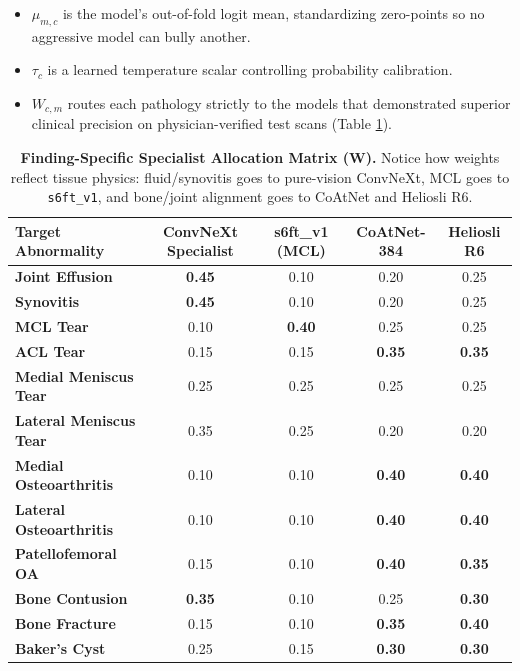 \documentclass[11pt,a4paper]{article}
\begin{document}
\begin{itemize}[leftmargin=*]
    \item $\mu_{m,c}$ is the model's out-of-fold logit mean, standardizing zero-points so no aggressive model can bully another.
    \item $\tau_c$ is a learned temperature scalar controlling probability calibration.
    \item $W_{c,m}$ routes each pathology strictly to the models that demonstrated superior clinical precision on physician-verified test scans (Table \ref{tab:routing}).
\end{itemize}

\begin{table}[h!]
\centering
\small
\renewcommand{\arraystretch}{1.25}
\begin{tabularx}{\textwidth}{l c c c c}
\toprule
\textbf{Target Abnormality} & \textbf{ConvNeXt Specialist} & \textbf{s6ft\_v1 (MCL)} & \textbf{CoAtNet-384} & \textbf{Heliosli R6} \\
\midrule
\textbf{Joint Effusion} & \textbf{0.45} & 0.10 & 0.20 & 0.25 \\
\textbf{Synovitis} & \textbf{0.45} & 0.10 & 0.20 & 0.25 \\
\textbf{MCL Tear} & 0.10 & \textbf{0.40} & 0.25 & 0.25 \\
\textbf{ACL Tear} & 0.15 & 0.15 & \textbf{0.35} & \textbf{0.35} \\
\textbf{Medial Meniscus Tear} & 0.25 & 0.25 & 0.25 & 0.25 \\
\textbf{Lateral Meniscus Tear} & 0.35 & 0.25 & 0.20 & 0.20 \\
\textbf{Medial Osteoarthritis} & 0.10 & 0.10 & \textbf{0.40} & \textbf{0.40} \\
\textbf{Lateral Osteoarthritis} & 0.10 & 0.10 & \textbf{0.40} & \textbf{0.40} \\
\textbf{Patellofemoral OA} & 0.15 & 0.10 & \textbf{0.40} & \textbf{0.35} \\
\textbf{Bone Contusion} & \textbf{0.35} & 0.10 & 0.25 & \textbf{0.30} \\
\textbf{Bone Fracture} & 0.15 & 0.10 & \textbf{0.35} & \textbf{0.40} \\
\textbf{Baker's Cyst} & 0.25 & 0.15 & \textbf{0.30} & \textbf{0.30} \\
\bottomrule
\end{tabularx}
\caption{\textbf{Finding-Specific Specialist Allocation Matrix ($\mathbf{W}$).} Notice how weights reflect tissue physics: fluid/synovitis goes to pure-vision ConvNeXt, MCL goes to \texttt{s6ft\_v1}, and bone/joint alignment goes to CoAtNet and Heliosli R6.}
\label{tab:routing}
\end{table}
\end{document}
